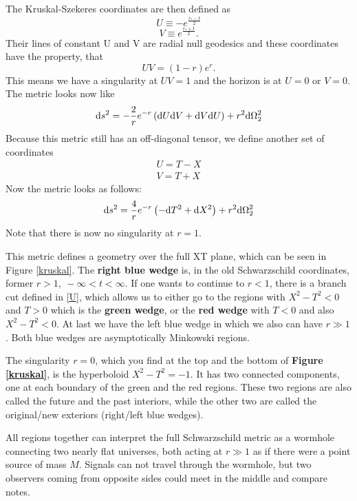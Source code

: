 	The Kruskal-Szekeres coordinates are then defined as
		\begin{equation}
			U\equiv -e^{\frac{r_*-t}{2}} \label{U}
		\end{equation}
		\begin{equation}
			V\equiv e^{\frac{r_*+t}{2}}.
		\end{equation}
	Their lines of constant U and V are radial null geodesics and these coordinates have the property, that
		\begin{equation}
			 UV=(1-r)e^r.
		\end{equation}
	This means we have a singularity at $UV=1$ and the horizon is at $U=0$ or $V=0$. The metric looks now like
		\begin{equation}
			\mathrm{d} s^2=-\frac{2}{r}e^{-r}\left(\mathrm{d} U \mathrm{d} V + \mathrm{d} V \mathrm{d} U\right)+r^2 \mathrm{d} \Omega^2_{2}
		\end{equation}
	Because this metric still has an off-diagonal tensor, we define another set of coordinates
		\begin{equation}
		\begin{split}
			U=T-X 	\\	
			V=T+X
		\end{split}
		\end{equation}
	Now the metric looks as follows:
		\begin{equation}\label{SchXT}
			\mathrm{d} s^2=\frac{4}{r}e^{-r}\left(- \mathrm{d} T^2+ \mathrm{d} X^2\right)+r^2 \mathrm{d} \Omega^2_2
		\end{equation}
	Note that there is now no singularity at $r=1$.
	
	This metric defines a geometry over the full XT plane, which can be seen in Figure \ref{kruskal}. The \textbf{right {\color{blue} blue} wedge} is, in the old Schwarzschild coordinates, former $r>1,~-\infty<t<\infty$. If one wants to continue to $r<1$, there is a branch cut  defined in \eqref{U}, which allows us to either go to the regions with $X^2-T^2<0$ and $T>0$ which is the \textbf{{\color{forestgreen} green} wedge}, or the \textbf{{\color{red} red} wedge} with $T<0$ and also $X^2-T^2<0$. At last we have the left {\color{blue} blue} wedge in which we also can have $r\gg1$. Both blue wedges are asymptotically Minkowski regions. 
	
	The singularity $r=0$, which you find at the top and the bottom of \textbf{Figure \ref{kruskal}}, is the hyperboloid $X^2-T^2=-1$. It has two connected components, one at each boundary of the {\color{forestgreen} green} and the {\color{red} red} regions. These two regions are also called the {\color{forestgreen} future} and the {\color{red} past} interiors, while the other two are called the original/new exteriors (right/left {\color{blue} blue} wedges).
	
	All regions together can interpret the full Schwarzschild metric as a wormhole connecting two nearly flat universes, both acting at $r\gg1$ as if there were a point source of mass $M$. Signals can not travel through the wormhole, but two observers coming from opposite sides could meet in the middle and compare notes. 